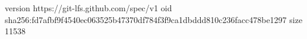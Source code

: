 version https://git-lfs.github.com/spec/v1
oid sha256:fd7afbf9f4540ec063525b47370df784f3f9ca1dbddd810c236facc478be1297
size 11538

